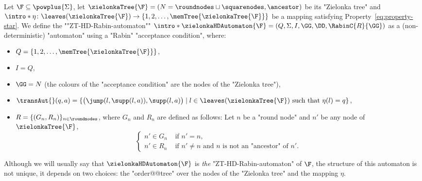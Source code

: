 \documentclass[10pt,a4paper]{amsart}
\renewcommand{\SS}{\Sigma}
\newcommand{\tst}{\text{ such that }}
\begin{document}
\begin{definition}\label{def-ZT: HD_Rabin_ZielonkaAutomaton}
	\AP Let $\F\subseteq \powplus{\SS}$, let $\zielonkaTree{\F} = (N = \roundnodes \sqcup \squarenodes, \ancestor)$ be its "Zielonka tree" and $\intro*\eta\colon \leaves(\zielonkaTree{\F}) \to \{1,2,\dots, \memTree{\zielonkaTree{\F}}\}$ be a mapping satisfying Property~\eqref{eq:property-star}.
	We define the ""ZT-HD-Rabin-automaton"" $\intro*\zielonkaHDAutomaton{\F}=(Q, \SS, I, \GG, \DD, \RabinC{R}{\GG})$ as a (non-deterministic) "automaton" using a "Rabin" "acceptance condition", where:
	\begin{itemize}
		\item $Q=\{1,2, \dots, \memTree{\zielonkaTree{\F}}\}$, 
		\item $I=Q$,\footnotemark{}
		\item $\GG = N$ (the colours of the "acceptance condition" are the nodes of the "Zielonka tree"),
		\item $\transAut{}(q,a) = \{\big(\jump(l,\supp(l,a)), \supp(l,a)\big) \mid l\in \leaves(\zielonkaTree{\F}) \tst \eta(l) = q\}$,
		\item $R = \{(G_n,R_n)\}_{n\in\roundnodes}$, where $G_n$ and $R_n$ are defined as follows: Let $n$ be a "round node" and $n'$ be any node of $\zielonkaTree{\F}$,
		\begin{equation*}
			\begin{cases}
				n' \in G_n & \text{ if } n'=n,\\
				n' \in R_n & \text{ if }  n'\neq n \text{ and } n \text{ is not an "ancestor" of } n'. 
			\end{cases}
		\end{equation*} 
	\end{itemize}
\end{definition}

\begin{remark}
	Although we will usually say that $\zielonkaHDAutomaton{\F}$ is \emph{the} "ZT-HD-Rabin-automaton" of $\F$, the structure of this automaton is not unique, it depends on two choices: the "order@@tree" over the nodes of the "Zielonka tree" and the mapping $\eta$.
\end{remark}
\end{document}
